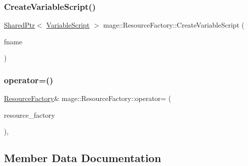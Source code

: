 \hypertarget{classmage_1_1_resource_factory_ac2e3dd6732fa2c2f9a4f27e587fe416c}{}\label{classmage_1_1_resource_factory_ac2e3dd6732fa2c2f9a4f27e587fe416c} 
\subsubsection{\texorpdfstring{Create\+Variable\+Script()}{CreateVariableScript()}}
{\footnotesize\ttfamily \hyperlink{namespacemage_a1e01ae66713838a7a67d30e44c67703e}{Shared\+Ptr}$<$ \hyperlink{classmage_1_1_variable_script}{Variable\+Script} $>$ mage\+::\+Resource\+Factory\+::\+Create\+Variable\+Script (\begin{DoxyParamCaption}\item[{const wstring \&}]{fname }\end{DoxyParamCaption})}

\hypertarget{classmage_1_1_resource_factory_a1a99724dd744fde5ce2a1488966b30d0}{}\label{classmage_1_1_resource_factory_a1a99724dd744fde5ce2a1488966b30d0} 
\subsubsection{\texorpdfstring{operator=()}{operator=()}}
{\footnotesize\ttfamily \hyperlink{classmage_1_1_resource_factory}{Resource\+Factory}\& mage\+::\+Resource\+Factory\+::operator= (\begin{DoxyParamCaption}\item[{const \hyperlink{classmage_1_1_resource_factory}{Resource\+Factory} \&}]{resource\+\_\+factory }\end{DoxyParamCaption})\hspace{0.3cm}{\ttfamily [private]}, {\ttfamily [delete]}}



\subsection{Member Data Documentation}
\hypertarget{classmage_1_1_resource_factory_a1e545bdec29a028ae913761f40d94c4c}{}\label{classmage_1_1_resource_factory_a1e545bdec29a028ae913761f40d94c4c} 
